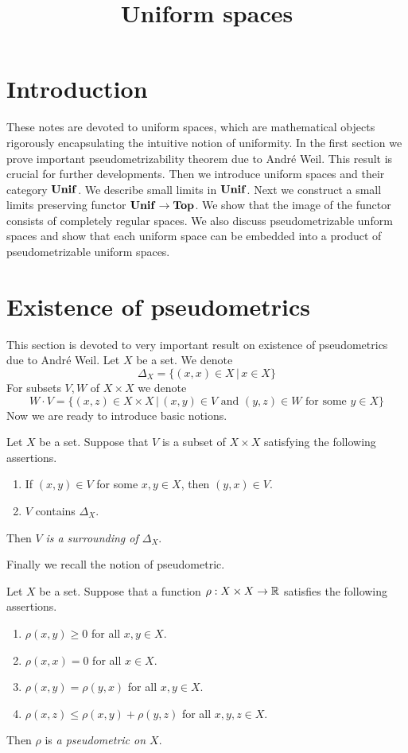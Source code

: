 



\title{Uniform spaces}
\date{}
\maketitle

\section{Introduction}
\noindent
These notes are devoted to uniform spaces, which are mathematical objects rigorously encapsulating the intuitive notion of uniformity. In the first section we prove  important pseudometrizability theorem due to Andr{\'e} Weil. This result is crucial for further developments. Then we introduce uniform spaces and their category $\mathbf{Unif}$. We describe small limits in $\mathbf{Unif}$. Next we construct a small limits preserving functor $\mathbf{Unif}\rightarrow \mathbf{Top}$. We show that the image of the functor consists of completely regular spaces. We also discuss pseudometrizable unform spaces and show that each uniform space can be embedded into a product of pseudometrizable uniform spaces.

\section{Existence of pseudometrics}
\noindent
This section is devoted to very important result on existence of pseudometrics due to Andr{\'e} Weil. Let $X$ be a set. We denote 
$$\Delta_X = \big\{(x,x)\in X\,\big|\,x\in X\big\}$$
For subsets $V,W$ of $X\times X$ we denote
$$W\cdot V = \big\{(x,z)\in X\times X\,\big|\,(x,y)\in V\mbox{ and }(y,z)\in W\mbox{ for some }y\in X\big\}$$
Now we are ready to introduce basic notions.

\begin{definition}
Let $X$ be a set. Suppose that $V$ is a subset of $X\times X$ satisfying the following assertions.
\begin{enumerate}[label=\textbf{(\arabic*)}, leftmargin=*]
\item If $(x,y)\in V$ for some $x,y\in X$, then $(y,x)\in V$.
\item $V$ contains $\Delta_X$.
\end{enumerate}
Then $V$ \textit{is a surrounding of $\Delta_X$}.
\end{definition}
\noindent
Finally we recall the notion of pseudometric.

\begin{definition}
Let $X$ be a set. Suppose that a function $\rho:X\times X\rightarrow {\mathbb R}$ satisfies the following assertions.
\begin{enumerate}[label=\textbf{(\arabic*)}, leftmargin=*]
\item $\rho(x,y) \geq 0$ for all $x,y\in X$.
\item $\rho(x,x) = 0$ for all $x\in X$.
\item $\rho(x,y) = \rho(y,x)$ for all $x,y\in X$.
\item $\rho(x,z)\leq \rho(x,y) + \rho(y,z)$ for all $x,y,z\in X$.
\end{enumerate}
Then $\rho$ is \textit{a pseudometric on $X$}.
\end{definition}

